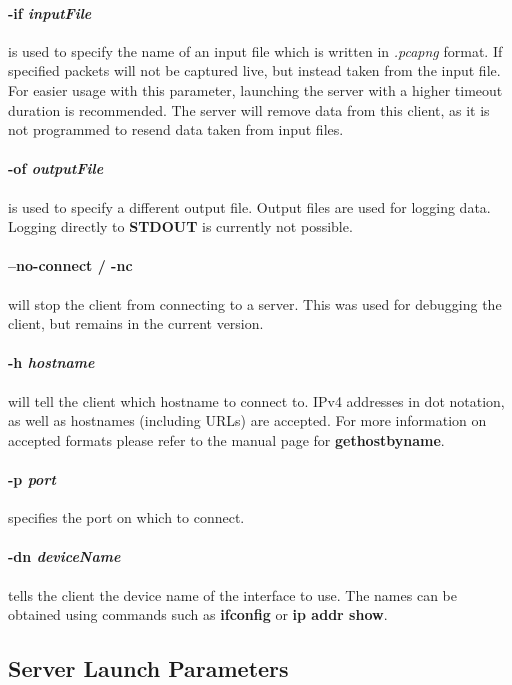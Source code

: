 \paragraph{-if \textit{inputFile}} is  used to specify the name of an input file which is written in \textit{.pcapng} format.
If specified packets will not be captured live, but instead taken from the input file.
For easier usage with this parameter, launching the server with a higher timeout duration is recommended.
The server will remove data from this client, as it is not programmed to resend data taken from input files.

\paragraph{-of \textit{outputFile}} is used to specify a different output file.
Output files are used for logging data.
Logging directly to \textbf{STDOUT} is currently not possible.

\paragraph{--no-connect / -nc} will stop the client from connecting to a server.
This was used for debugging the client, but remains in the current version.

\paragraph{-h \textit{hostname}} will tell the client which hostname to connect to.
IPv4 addresses in dot notation, as well as hostnames (including URLs) are accepted.
For more information on accepted formats please refer to the manual page for \textbf{gethostbyname}.

\paragraph{-p \textit{port}} specifies the port on which to connect.

\paragraph{-dn \textit{deviceName}} tells the client the device name of the interface to use.
The names can be obtained using commands such as \textbf{ifconfig} or \textbf{ip addr show}.

\subsection*{Server Launch Parameters}
